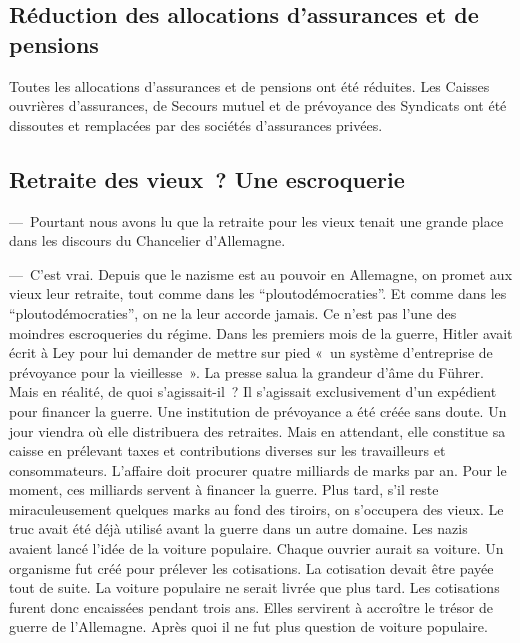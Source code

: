 \documentclass[french,twoside]{book} %
\begin{document}
\subsection[Réduction des allocations d’assurances et de pensions]{Réduction des allocations d’assurances et de pensions}
\noindent Toutes les allocations d’assurances et de pensions ont été réduites. Les Caisses ouvrières d’assurances, de Secours mutuel et de prévoyance des Syndicats ont été dissoutes et remplacées par des sociétés d’assurances privées.
\subsection[Retraite des vieux ? Une escroquerie]{Retraite des vieux ? Une escroquerie}
\noindent — Pourtant nous avons lu que la retraite pour les vieux tenait une grande place dans les discours du Chancelier d’Allemagne.\par
— C’est vrai. Depuis que le nazisme est au pouvoir en Allemagne, on promet aux vieux leur retraite, tout comme dans les “ploutodémocraties”. Et comme dans les “ploutodémocraties”, on ne la leur accorde jamais. Ce n’est pas l’une des moindres escroqueries du régime. Dans les premiers mois de la guerre, Hitler avait écrit à Ley pour lui demander de mettre sur pied « un système d’entreprise de prévoyance pour la vieillesse ». La presse salua la grandeur d’âme du Führer. Mais en réalité, de quoi s’agissait-il ? Il s’agissait exclusivement d’un expédient pour financer la guerre. Une institution de prévoyance a été créée sans doute. Un jour viendra où elle distribuera des retraites. Mais en attendant, elle constitue sa caisse en prélevant taxes et contributions diverses sur les travailleurs et consommateurs. L’affaire doit procurer quatre milliards de marks par an. Pour le moment, ces milliards servent à financer la guerre. Plus tard, s’il reste miraculeusement quelques marks au fond des tiroirs, on s’occupera des vieux. Le truc avait été déjà utilisé avant la guerre dans un autre domaine. Les nazis avaient lancé l’idée de la voiture populaire. Chaque ouvrier aurait sa voiture. Un organisme fut créé pour prélever les cotisations. La cotisation devait être payée tout de suite. La voiture populaire ne serait livrée que plus tard. Les cotisations furent donc encaissées pendant trois ans. Elles servirent à accroître le trésor de guerre de l’Allemagne. Après quoi il ne fut plus question de voiture populaire.
\end{document}

